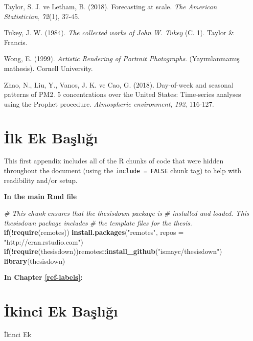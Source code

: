 \documentclass[12pt,twoside]{deuthesis}
\newenvironment{Shaded}{\begin{snugshade}}{\end{snugshade}}
\newcommand{\AttributeTok}[1]{\textcolor[rgb]{0.13,0.29,0.53}{#1}}
\newcommand{\CommentTok}[1]{\textcolor[rgb]{0.56,0.35,0.01}{\textit{#1}}}
\newcommand{\ControlFlowTok}[1]{\textcolor[rgb]{0.13,0.29,0.53}{\textbf{#1}}}
\newcommand{\FunctionTok}[1]{\textcolor[rgb]{0.13,0.29,0.53}{\textbf{#1}}}
\newcommand{\NormalTok}[1]{#1}
\newcommand{\SpecialCharTok}[1]{\textcolor[rgb]{0.81,0.36,0.00}{\textbf{#1}}}
\newcommand{\StringTok}[1]{\textcolor[rgb]{0.31,0.60,0.02}{#1}}
\begin{document}
\begin{CSLReferences}{1}{0}
\leavevmode{}%
Taylor, S. J. ve Letham, B. (2018). Forecasting at scale. \emph{The American Statistician}, \emph{72}(1), 37-45.

\leavevmode{}%
Tukey, J. W. (1984). \emph{The collected works of John W. Tukey} (C. 1). Taylor \& Francis.

\leavevmode{}%
Wong, E. (1999). \emph{{Artistic Rendering of Portrait Photographs}}. (Yayımlanmamış mathesis). Cornell University.

\leavevmode{}%
Zhao, N., Liu, Y., Vanos, J. K. ve Cao, G. (2018). Day-of-week and seasonal patterns of PM2. 5 concentrations over the United States: Time-series analyses using the Prophet procedure. \emph{Atmospheric environment}, \emph{192}, 116-127.

\end{CSLReferences}

\setlength{\parindent}{-0.20in}
\setlength{\leftskip}{0.20in}
\setlength{\parskip}{8pt}

\appendix

\hypertarget{ilk-ek-baux15flux131ux11fux131}{%
\chapter{İlk Ek Başlığı}\label{ilk-ek-baux15flux131ux11fux131}}

This first appendix includes all of the R chunks of code that were hidden throughout the document (using the \texttt{include\ =\ FALSE} chunk tag) to help with readibility and/or setup.

\textbf{In the main Rmd file}

\begin{Shaded}
\begin{Highlighting}[]
\CommentTok{\# This chunk ensures that the thesisdown package is}
\CommentTok{\# installed and loaded. This thesisdown package includes}
\CommentTok{\# the template files for the thesis.}
\ControlFlowTok{if}\NormalTok{(}\SpecialCharTok{!}\FunctionTok{require}\NormalTok{(remotes)) }\FunctionTok{install.packages}\NormalTok{(}\StringTok{"remotes"}\NormalTok{, }\AttributeTok{repos =} \StringTok{"http://cran.rstudio.com"}\NormalTok{)}
\ControlFlowTok{if}\NormalTok{(}\SpecialCharTok{!}\FunctionTok{require}\NormalTok{(thesisdown))remotes}\SpecialCharTok{::}\FunctionTok{install\_github}\NormalTok{(}\StringTok{"ismayc/thesisdown"}\NormalTok{)}
\FunctionTok{library}\NormalTok{(thesisdown)}
\end{Highlighting}
\end{Shaded}

\textbf{In Chapter \ref{ref-labels}:}

\hypertarget{ikinci-ek-baux15flux131ux11fux131}{%
\chapter{İkinci Ek Başlığı}\label{ikinci-ek-baux15flux131ux11fux131}}

İkinci Ek
\end{document}
